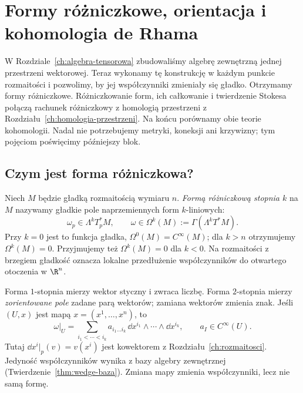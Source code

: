 \chapter{Formy różniczkowe, orientacja i kohomologia de Rhama}
\label{ch:formy-de-rham}

W Rozdziale~\ref{ch:algebra-tensorowa} zbudowaliśmy algebrę
zewnętrzną jednej przestrzeni wektorowej. Teraz wykonamy tę
konstrukcję w każdym punkcie rozmaitości i pozwolimy, by jej
współczynniki zmieniały się gładko. Otrzymamy formy różniczkowe.
Różniczkowanie form, ich całkowanie i twierdzenie Stokesa
połączą rachunek różniczkowy z homologią przestrzeni z
Rozdziału~\ref{ch:homologia-przestrzeni}. Na końcu porównamy
obie teorie kohomologii. Nadal nie potrzebujemy metryki,
koneksji ani krzywizny; tym pojęciom poświęcimy późniejszy blok.

\section{Czym jest forma różniczkowa?}
\label{sec:formy-definicje}

\begin{definicja}
\label{def:forma-rozniczkowa}
Niech $M$ będzie gładką rozmaitością wymiaru $n$.
\emph{Formą różniczkową stopnia $k$} na $M$ nazywamy
gładkie pole naprzemiennych form $k$-liniowych:
\[
 \omega_p\in\Lambda^k T_p^*M,
 \qquad \omega\in\Omega^k(M)
 :=\Gamma(\Lambda^k T^*M).
\]
Przy $k=0$ jest to funkcja gładka,
$\Omega^0(M)=C^\infty(M)$; dla $k>n$ otrzymujemy
$\Omega^k(M)=0$. Przyjmujemy też $\Omega^k(M)=0$ dla $k<0$.
Na rozmaitości z brzegiem gładkość
oznacza lokalne przedłużenie współczynników do
otwartego otoczenia w $\R^n$.
\end{definicja}

Forma $1$-stopnia mierzy wektor styczny i zwraca liczbę.
Forma $2$-stopnia mierzy \emph{zorientowane pole} zadane
parą wektorów; zamiana wektorów zmienia znak.
Jeśli $(U,x)$ jest mapą $x=(x^1,\ldots,x^n)$, to
\begin{equation}\label{eq:forma-lokalna}
 \omega|_U=\sum_{i_1<\cdots<i_k}
 a_{i_1\ldots i_k}\,\dd x^{i_1}\wedge\cdots\wedge\dd x^{i_k},
 \qquad a_I\in C^\infty(U).
\end{equation}
Tutaj $\dd x^i|_p(v)=v(x^i)$ jest kowektorem z
Rozdziału~\ref{ch:rozmaitosci}. Jedyność współczynników
wynika z bazy algebry zewnętrznej
(Twierdzenie~\ref{thm:wedge-baza}). Zmiana mapy zmienia
współczynniki, lecz nie samą formę.


